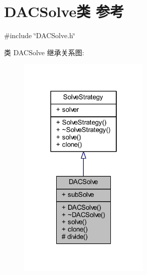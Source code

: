 \hypertarget{classDACSolve}{}\section{D\+A\+C\+Solve类 参考}
\label{classDACSolve}


{\ttfamily \#include \char`\"{}D\+A\+C\+Solve.\+h\char`\"{}}



类 D\+A\+C\+Solve 继承关系图\+:
\nopagebreak
\begin{figure}[H]
\begin{center}
\leavevmode
\includegraphics[width=178pt]{classDACSolve__inherit__graph}
\end{center}
\end{figure}


